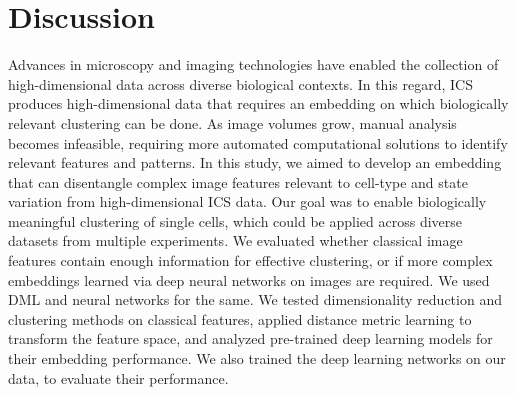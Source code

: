 \documentclass[12pt,a4paper]{article}
\begin{document}


\par\hspace{2cm} 



\newpage
\section{Discussion}
\label{Discussion}

Advances in microscopy and imaging technologies have enabled the collection of high-dimensional data across diverse biological contexts. In this regard, ICS produces high-dimensional data that requires an embedding on which biologically relevant clustering can be done. As image volumes grow, manual analysis becomes infeasible, requiring more automated computational solutions to identify relevant features and patterns. In this study, we aimed to develop an embedding that can disentangle complex image features relevant to cell-type and state variation from high-dimensional ICS data. Our goal was to enable biologically meaningful clustering of single cells, which could be applied across diverse datasets from multiple experiments. We evaluated whether classical image features contain enough information for effective clustering, or if more complex embeddings learned via deep neural networks on images are required. We used DML and neural networks for the same. We tested dimensionality reduction and clustering methods on classical features, applied distance metric learning to transform the feature space, and analyzed pre-trained deep learning models for their embedding performance. We also trained the deep learning networks on our data, to evaluate their performance.
\end{document}
